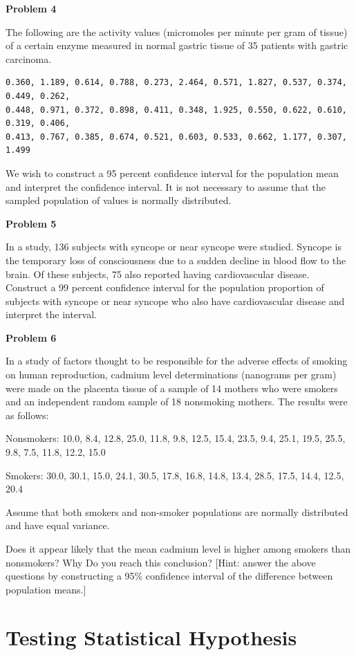 \documentclass[
]{book}
\begin{document}
\textbf{Problem 4}

The following are the activity values (micromoles per minute per gram of tissue) of a
certain enzyme measured in normal gastric tissue of 35 patients with gastric carcinoma.

\begin{verbatim}
0.360, 1.189, 0.614, 0.788, 0.273, 2.464, 0.571, 1.827, 0.537, 0.374, 0.449, 0.262, 
0.448, 0.971, 0.372, 0.898, 0.411, 0.348, 1.925, 0.550, 0.622, 0.610, 0.319, 0.406, 
0.413, 0.767, 0.385, 0.674, 0.521, 0.603, 0.533, 0.662, 1.177, 0.307, 1.499
\end{verbatim}

We wish to construct a 95 percent confidence interval for the population mean and interpret the confidence interval. It is not necessary to assume that the sampled population of values is normally distributed.

\textbf{Problem 5}

In a study, 136 subjects with syncope or near syncope were studied. Syncope is the temporary loss of consciousness due to a sudden decline in blood flow to the brain. Of these subjects, 75 also reported having cardiovascular disease. Construct a 99 percent confidence interval for the population proportion of subjects with syncope or near syncope who also have cardiovascular disease and interpret the interval.

\textbf{Problem 6}

In a study of factors thought to be responsible for the adverse effects of smoking on human
reproduction, cadmium level determinations (nanograms per gram) were made on the placenta tissue of a sample of 14 mothers who were smokers and an independent random sample of 18 nonsmoking
mothers. The results were as follows:

Nonsmokers: 10.0, 8.4, 12.8, 25.0, 11.8, 9.8, 12.5, 15.4, 23.5, 9.4, 25.1, 19.5, 25.5, 9.8, 7.5, 11.8, 12.2, 15.0

Smokers: 30.0, 30.1, 15.0, 24.1, 30.5, 17.8, 16.8, 14.8, 13.4, 28.5, 17.5, 14.4, 12.5, 20.4

Assume that both smokers and non-smoker populations are normally distributed and have equal variance.

Does it appear likely that the mean cadmium level is higher among smokers than nonsmokers? Why
Do you reach this conclusion? {[}Hint: answer the above questions by constructing a 95\% confidence interval of the difference between population means.{]}

\hypertarget{testing-statistical-hypothesis}{%
\chapter{Testing Statistical Hypothesis}\label{testing-statistical-hypothesis}}
\end{document}
